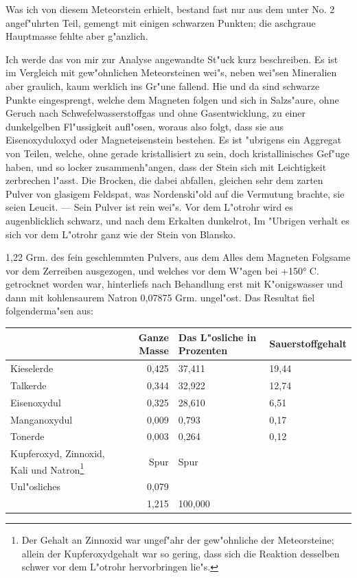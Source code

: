 \documentclass[a4paper, 11pt, oneside]{article}
\begin{document}
Was ich von diesem Meteorstein erhielt, bestand fast nur aus dem unter No. 2 angef"uhrten Teil, gemengt mit einigen schwarzen Punkten; die aschgraue Hauptmasse fehlte aber g"anzlich.

Ich werde das von mir zur Analyse angewandte St"uck kurz beschreiben. Es ist im Vergleich mit gew"ohnlichen Meteorsteinen wei"s, neben wei"sen Mineralien aber graulich, kaum werklich ins Gr"une fallend. Hie und da sind schwarze Punkte eingesprengt, welche dem Magneten folgen und sich in Salzs"aure, ohne Geruch nach Schwefelwasserstoffgas und ohne Gasentwicklung, zu einer dunkelgelben Fl"ussigkeit aufl"osen, woraus also folgt, dass sie aus Eisenoxyduloxyd oder Magneteisenstein bestehen. Es ist "ubrigens ein Aggregat von Teilen, welche, ohne gerade kristallisiert zu sein, doch kristallinisches Gef"uge haben, und so locker zusammenh"angen, dass der Stein sich mit Leichtigkeit zerbrechen l"asst. Die Brocken, die dabei abfallen, gleichen sehr dem zarten Pulver von glasigem Feldspat, was Nordenski"old auf die Vermutung brachte, sie seien Leucit. --- Sein Pulver ist rein wei"s. Vor dem L"otrohr wird es augenblicklich schwarz, und nach dem Erkalten dunkelrot, Im "Ubrigen verhalt es sich vor dem L"otrohr ganz wie der Stein von Blansko.

1,22 Grm. des fein geschlemmten Pulvers, aus dem Alles dem Magneten Folgsame vor dem Zerreiben ausgezogen, und welches vor dem W"agen bei +150° C. getrocknet worden war, hinterliefs nach Behandlung erst mit K"onigswasser und dann mit kohlensaurem Natron 0,07875 Grm. ungel"ost. Das Resultat fiel folgenderma"sen aus:
\begin{center}
\begin{tabular}{ |p{30mm}|r|p{20mm}|p{24mm}| }
    \hline
     & Ganze Masse & Das L"osliche in Prozenten & Sauerstoffgehalt\\\hline
    Kieselerde & 0,425 & 37,411 & 19,44\\\hline
    Talkerde & 0,344 & 32,922 & 12,74\\\hline
    Eisenoxydul & 0,325 & 28,610 & 6,51\\\hline
    Manganoxydul & 0,009 & 0,793 & 0,17\\\hline
    Tonerde & 0,003 & 0,264 & 0,12\\\hline
    Kupferoxyd, Zinnoxid, Kali und Natron\footnote{Der Gehalt an Zinnoxid war ungef"ahr der gew"ohnliche der Meteorsteine; allein der Kupferoxydgehalt war so gering, dass sich die Reaktion desselben schwer vor dem L"otrohr hervorbringen lie"s.} & Spur & Spur & \\\hline
    Unl"osliches & 0,079 & & \\\hline
     & 1,215 & 100,000 & \\
    \hline
\end{tabular}
\end{center}
\end{document}
